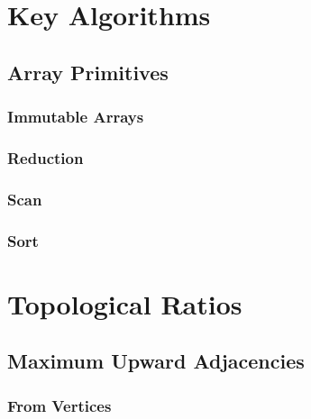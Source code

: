 
\appendix    %

\chapter{Key Algorithms}

\section{Array Primitives}

\subsection{Immutable Arrays}

\subsection{Reduction}

\subsection{Scan}

\subsection{Sort}

\chapter{Topological Ratios}

\section{Maximum Upward Adjacencies}

\subsection{From Vertices}

